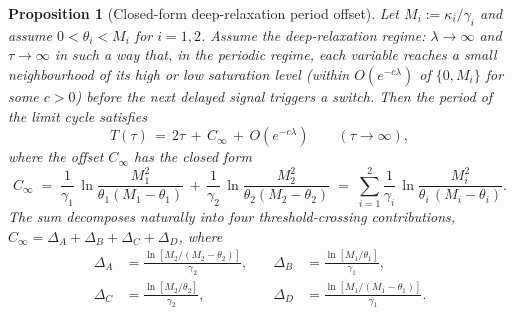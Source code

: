 \documentclass[10pt,a4paper]{amsart}
\newtheorem{proposition}{Proposition}
\begin{document}
\begin{proposition}[Closed-form deep-relaxation period offset]
\label{prop:Cinfty}
Let $M_i:=\kappa_i/\gamma_i$ and assume $0<\theta_i<M_i$ for $i=1,2$.
Assume the deep-relaxation regime: $\lambda\to\infty$ and $\tau\to\infty$
in such a way that, in the periodic regime, each variable reaches a small
neighbourhood of its high or low saturation level (within $O(e^{-c\lambda})$
of $\{0,M_i\}$ for some $c>0$) before the next delayed signal triggers a
switch. Then the period of the limit cycle satisfies
\begin{equation}
T(\tau) \,=\, 2\tau \,+\, C_\infty \,+\, O(e^{-c\lambda})
\qquad(\tau\to\infty),
\label{eq:Cinfty_asymp}
\end{equation}
where the offset $C_\infty$ has the closed form
\begin{equation}
C_\infty
\;=\; \frac{1}{\gamma_1}\,\ln\!\frac{M_1^{2}}{\theta_1(M_1-\theta_1)}
   \,+\,\frac{1}{\gamma_2}\,\ln\!\frac{M_2^{2}}{\theta_2(M_2-\theta_2)}
\;=\; \sum_{i=1}^{2}\frac{1}{\gamma_i}\,
       \ln\!\frac{M_i^{2}}{\theta_i\,(M_i-\theta_i)}.
\label{eq:Cinf}
\end{equation}
The sum decomposes naturally into four threshold-crossing
contributions, $C_\infty = \Delta_A+\Delta_B+\Delta_C+\Delta_D$, where
\begin{equation}
\begin{aligned}
\Delta_A&=\frac{\ln[M_2/(M_2-\theta_2)]}{\gamma_2},
&\quad
\Delta_B&=\frac{\ln[M_1/\theta_1]}{\gamma_1},\\[4pt]
\Delta_C&=\frac{\ln[M_2/\theta_2]}{\gamma_2},
&\quad
\Delta_D&=\frac{\ln[M_1/(M_1-\theta_1)]}{\gamma_1}.
\end{aligned}
\label{eq:phase_durations}
\end{equation}
\end{proposition}
\end{document}
